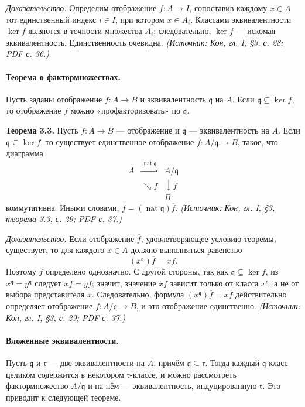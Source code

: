 \documentclass[a4paper,12pt]{article}
\begin{document}
\emph{Доказательство.} Определим отображение \(f\colon A\to I\), сопоставив каждому \(x\in A\) тот единственный индекс \(i\in I\), при котором \(x\in A_i\). Классами эквивалентности \(\ker f\) являются в точности множества \(A_i\); следовательно, \(\ker f\) — искомая эквивалентность. Единственность очевидна.
\textit{(Источник: Кон, гл. I, §3, с. 28; PDF с. 36.)}

\paragraph{Теорема о фактормножествах.}
Пусть заданы отображение \(f\colon A\to B\) и эквивалентность \(\mathfrak{q}\) на \(A\). Если \(\mathfrak{q}\subseteq\ker f\), то отображение \(f\) можно «профакторизовать» по \(\mathfrak{q}\).

\textbf{Теорема 3.3.} Пусть \(f\colon A\to B\) — отображение и \(\mathfrak{q}\) — эквивалентность на \(A\). Если \(\mathfrak{q}\subseteq\ker f\), то существует единственное отображение \(\overline{f}\colon A/\mathfrak{q}\to B\), такое, что диаграмма
\[
\begin{array}{ccc}
A & \xrightarrow{\ \operatorname{nat}\mathfrak{q}\ } & A/\mathfrak{q}\\
& \searrow{\scriptstyle f} & \downarrow{\scriptstyle \overline{f}}\\
& & B
\end{array}
\]
коммутативна. Иными словами, \(f=(\operatorname{nat}\mathfrak{q})\overline{f}\).
\textit{(Источник: Кон, гл. I, §3, теорема 3.3, с. 29; PDF с. 37.)}

\emph{Доказательство.} Если отображение \(\overline{f}\), удовлетворяющее условию теоремы, существует, то для каждого \(x\in A\) должно выполняться равенство
\[
(x^{\mathfrak{q}})\overline{f}=xf.
\]
Поэтому \(\overline{f}\) определено однозначно. С другой стороны, так как \(\mathfrak{q}\subseteq\ker f\), из \(x^{\mathfrak{q}}=y^{\mathfrak{q}}\) следует \(xf=yf\); значит, значение \(xf\) зависит только от класса \(x^{\mathfrak{q}}\), а не от выбора представителя \(x\). Следовательно, формула \((x^{\mathfrak{q}})\overline{f}=xf\) действительно определяет отображение \(\overline{f}\colon A/\mathfrak{q}\to B\), и это отображение единственно.
\textit{(Источник: Кон, гл. I, §3, с. 29; PDF с. 37.)}

\paragraph{Вложенные эквивалентности.}
Пусть \(\mathfrak{q}\) и \(\mathfrak{r}\) — две эквивалентности на \(A\), причём \(\mathfrak{q}\subseteq\mathfrak{r}\). Тогда каждый \(\mathfrak{q}\)-класс целиком содержится в некотором \(\mathfrak{r}\)-классе, и можно рассмотреть фактормножество \(A/\mathfrak{q}\) и на нём — эквивалентность, индуцированную \(\mathfrak{r}\). Это приводит к следующей теореме.
\end{document}
